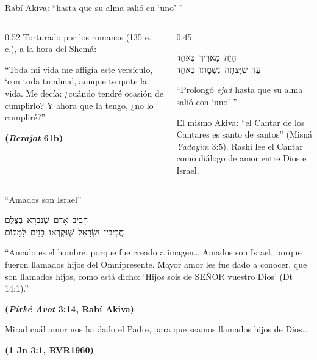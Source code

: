 \documentclass[hyperref={bookmarks=false},aspectratio=169]{beamer}
\newcommand{\heb}[1]{\mbox{\foreignlanguage{hebrew}{#1}}}
\newcommand{\SENOR}{S{\fontsize{0.78em}{1em}\selectfont EÑOR}}
\newcommand{\fuente}[1]{\par\hfill{\upshape\bfseries\footnotesize\textcolor{azul}{#1}}}
\begin{document}
\begin{frame}{Rabí Akiva: ``hasta que su alma salió en `uno' ''}
\begin{columns}[c,onlytextwidth]
\begin{column}{0.52\textwidth}\small
Torturado por los romanos (135 e.\,c.), a la hora del Shemá:\par\smallskip
\begin{tcolorbox}[colback=papiro,colframe=azul,boxrule=0.8pt,arc=3pt]
\scriptsize ``Toda mi vida me afligía este versículo, `con toda tu alma', aunque te quite la vida. Me decía: ¿cuándo tendré ocasión de cumplirlo? Y ahora que la tengo, ¿no lo cumpliré?''\fuente{(\emph{Berajot} 61b)}
\end{tcolorbox}
\end{column}
\begin{column}{0.45\textwidth}
\begin{center}\heb{הָיָה מַאֲרִיךְ בְּאֶחָד}\\ \heb{עַד שֶׁיָּצְתָה נִשְׁמָתוֹ בְּאֶחָד}\end{center}
\small ``Prolongó \emph{ejad} hasta que su alma salió con `uno' ''.\par\medskip
\scriptsize El mismo Akiva: ``el Cantar de los Cantares es santo de santos'' (Misná \emph{Yadayim} 3:5). Rashi lee el Cantar como diálogo de amor entre Dios e Israel.
\end{column}
\end{columns}
\end{frame}

\begin{frame}{``Amados son Israel''}
\begin{center}\heb{חָבִיב אָדָם שֶׁנִּבְרָא בְצֶלֶם}\\[1pt]\heb{חֲבִיבִין יִשְׂרָאֵל שֶׁנִּקְרְאוּ בָנִים לַמָּקוֹם}\end{center}
\begin{tcolorbox}[colback=papiro,colframe=azul,boxrule=0.8pt,arc=3pt]
\small ``Amado es el hombre, porque fue creado a imagen\ldots{} Amados son Israel, porque fueron llamados hijos del Omnipresente. Mayor amor les fue dado a conocer, que son llamados hijos, como está dicho: `Hijos sois de \SENOR{} vuestro Dios' (Dt 14:1).''\fuente{(\emph{Pirké Avot} 3:14, Rabí Akiva)}
\end{tcolorbox}
\begin{cita}Mirad cuál amor nos ha dado el Padre, para que seamos llamados hijos de Dios\ldots\fuente{(1 Jn 3:1, RVR1960)}\end{cita}
\end{frame}
\end{document}
